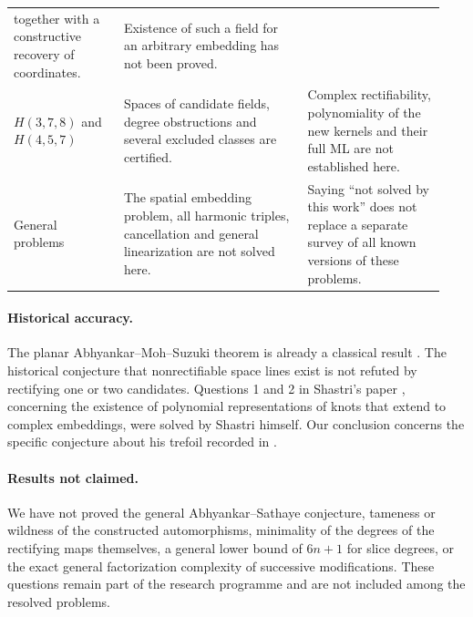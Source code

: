 \begin{longtable}{@{}L{0.24\linewidth}L{0.40\linewidth}L{0.30\linewidth}@{}}
together with a constructive recovery of coordinates. & Existence of such
a field for an arbitrary embedding has not been proved.\\[5pt]
$H(3,7,8)$ and $H(4,5,7)$ & Spaces of candidate fields, degree obstructions
and several excluded classes are certified. & Complex rectifiability,
polynomiality of the new kernels and their full ML are not established here.\\[5pt]
General problems & The spatial embedding problem, all harmonic triples,
cancellation and general linearization are not solved here. & Saying
``not solved by this work'' does not replace a separate survey of all known
versions of these problems.\\\bottomrule
\end{longtable}

\paragraph{Historical accuracy.}
The planar Abhyankar--Moh--Suzuki theorem is already a classical
result \cite{AM,Suzuki}. The historical conjecture that nonrectifiable
space lines exist is not refuted by rectifying one or two candidates.
Questions 1 and 2 in Shastri's paper \cite{Shastri}, concerning the existence
of polynomial representations of knots that extend to complex embeddings,
were solved by Shastri himself. Our conclusion concerns the specific
conjecture about his trefoil recorded in \cite[p.~1319]{vdER}.

\paragraph{Results not claimed.}
We have not proved the general Abhyankar--Sathaye conjecture, tameness or
wildness of the constructed automorphisms, minimality of the degrees of the
rectifying maps themselves, a general lower bound of $6n+1$ for slice
degrees, or the exact general factorization complexity of successive
modifications. These questions remain part of the research programme
and are not included among the resolved problems.
